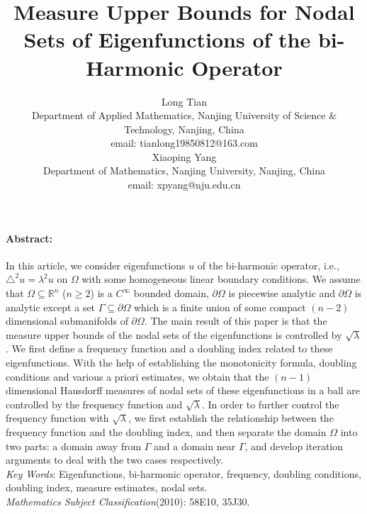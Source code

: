 \documentclass[a4paper, 12pt, onecolumn]{article} \textwidth 148mm
\begin{document}
\newtheorem{theorem}{Theorem}[section]
\newtheorem{proposition}[theorem]{Proposition}
\newtheorem{remark}[theorem]{Remark}
\newtheorem{corollary}[theorem]{Corollary}
\newtheorem{definition}{Definition}[section]
\newtheorem{lemma}[theorem]{Lemma}

\title{\large Measure Upper Bounds for Nodal Sets of Eigenfunctions of the bi-Harmonic Operator}
\author{\normalsize Long Tian \\
\scriptsize Department of Applied Mathematics, Nanjing University
of Science $\&$ Technology, Nanjing, China
\\
\scriptsize email: tianlong19850812@163.com\\
\normalsize Xiaoping Yang\\
\scriptsize Department of Mathematics, Nanjing University, Nanjing, China
\\
\scriptsize email: xpyang@nju.edu.cn}


\date{}
\maketitle
 \fontsize{12}{22}\selectfont\small
 \paragraph{Abstract:}
 In this article, we consider eigenfunctions $u$ of the bi-harmonic operator, i.e.,
 $\triangle^2u=\lambda^2u$ on $\Omega$ with some homogeneous linear boundary conditions.
We assume that $\Omega\subseteq\mathbb{R}^n$ ($n\geq2$) is a $C^{\infty}$ bounded domain, $\partial\Omega$ is piecewise analytic and $\partial\Omega$ is analytic except a set $\Gamma\subseteq\partial\Omega$ which is a finite union of some compact $(n-2)$ dimensional submanifolds of $\partial\Omega$. The main result of this paper is that the measure upper bounds of the nodal sets of the eigenfunctions is controlled by $\sqrt{\lambda}$. We first define a frequency function and a doubling index related to these eigenfunctions. With the help of establishing the monotonicity formula, doubling conditions and various a priori estimates, we obtain that the $(n-1)$ dimensional Hausdorff measures of nodal sets of these eigenfunctions in a ball are controlled by the frequency function and $\sqrt{\lambda}$.
In order to further control the frequency function with $\sqrt{\lambda}$, we first establish the relationship between the frequency function and the doubling index, and then separate the domain $\Omega$ into two parts: a domain away from $\Gamma$ and a domain near $\Gamma$, and develop iteration arguments to deal with the two cases respectively.
\\[10pt]
\emph{Key Words}: Eigenfunctions, bi-harmonic operator, frequency, doubling conditions, doubling index,
 measure estimates, nodal sets.
\\[10pt]
\emph{Mathematics Subject Classification}(2010): 58E10, 35J30.
\end{document}
